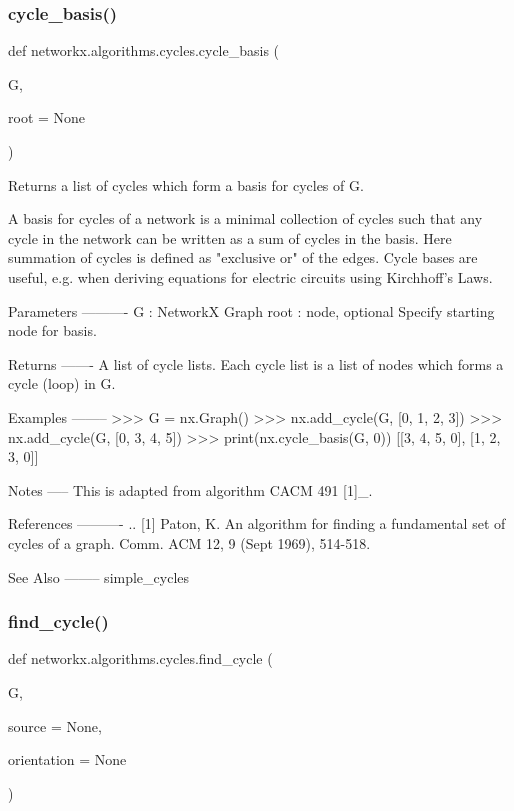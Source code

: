 \subsubsection{\texorpdfstring{cycle\+\_\+basis()}{cycle\_basis()}}
{\footnotesize\ttfamily def networkx.\+algorithms.\+cycles.\+cycle\+\_\+basis (\begin{DoxyParamCaption}\item[{}]{G,  }\item[{}]{root = {\ttfamily None} }\end{DoxyParamCaption})}

\begin{DoxyVerb}Returns a list of cycles which form a basis for cycles of G.

A basis for cycles of a network is a minimal collection of
cycles such that any cycle in the network can be written
as a sum of cycles in the basis.  Here summation of cycles
is defined as "exclusive or" of the edges. Cycle bases are
useful, e.g. when deriving equations for electric circuits
using Kirchhoff's Laws.

Parameters
----------
G : NetworkX Graph
root : node, optional
   Specify starting node for basis.

Returns
-------
A list of cycle lists.  Each cycle list is a list of nodes
which forms a cycle (loop) in G.

Examples
--------
>>> G = nx.Graph()
>>> nx.add_cycle(G, [0, 1, 2, 3])
>>> nx.add_cycle(G, [0, 3, 4, 5])
>>> print(nx.cycle_basis(G, 0))
[[3, 4, 5, 0], [1, 2, 3, 0]]

Notes
-----
This is adapted from algorithm CACM 491 [1]_.

References
----------
.. [1] Paton, K. An algorithm for finding a fundamental set of
   cycles of a graph. Comm. ACM 12, 9 (Sept 1969), 514-518.

See Also
--------
simple_cycles
\end{DoxyVerb}
 \mbox{\label{namespacenetworkx_1_1algorithms_1_1cycles_ab86186b756148879600221a62b7f006b}} 
\subsubsection{\texorpdfstring{find\+\_\+cycle()}{find\_cycle()}}
{\footnotesize\ttfamily def networkx.\+algorithms.\+cycles.\+find\+\_\+cycle (\begin{DoxyParamCaption}\item[{}]{G,  }\item[{}]{source = {\ttfamily None},  }\item[{}]{orientation = {\ttfamily None} }\end{DoxyParamCaption})}

